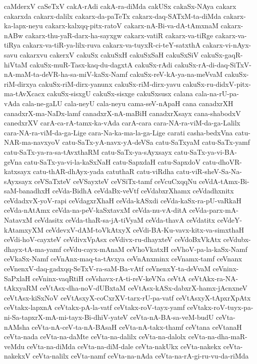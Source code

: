 {caMderxV
caSeTxV
cakA-rAdi
cakA-ra-diMda
cakUSx
cakaSx-NAya
cakarx
cakarxda
cakarx-dalilx
cakarx-da-paTeTx
cakarx-daq-SATxM-ta-diMda
cakarx-ka-lapx-neyu
cakarx-kalxqq-pitx-ratoV
cakarx-nA-Bi-va-dA-tAmxnaM
cakarx-nABw
cakarx-thu-yaR-darx-ha-sayxgw
cakarx-vatiR
cakarx-va-tiRge
cakarx-va-tiRya
cakarx-va-tiR-ya-lilx-ruva
cakarx-va-tuyxR-ci-teY-satxthA
cakarx-vi-nAyx-savu
cakarxvu
cakerxV
cakuSx
cakuSxH
cakuSxSaH
cakuSxSiV
cakuSx-gaqR-hiVtaM
cakuSx-muR-Tasx-kaq-du-dagxtA
cakuSx-rAdi
cakuSx-rA-di-daq-SiTxV-nA-maM-ta-deVR-ha-sa-miV-kaSx-Namf
cakuSx-reV-kA-ya-na-meVvaM
cakuSx-riM-dirxya
cakuSx-riM-dirx-yanunx
cakuSx-riM-dirx-yavu
cakuSx-ru-didxV-pitx-ma-tAvXcacx
cakuSx-sisxgU
cakuSx-sisxge
cakuSxsusx
calana
cala-na-rU-pa-vAda
cala-ne-gaLU
cala-neyU
cala-neyu
cama-seV-nApaH
cana
canadxrXH
canadxrX-ma-NaDx-lamf
canadxrX-nA-maBiH
canadxrXsayx
cana-shabodxV
canedxrXV
carA-ca-rA-tamx-ka-vAda
carA-cara
cara-NA-ra-viM-da-ga-Lalilx
cara-NA-ra-viM-da-ga-Lige
cara-Na-ka-ma-la-ga-Lige
carati
casha-bedxVna
catu-NAR-ma-navxyoV
catu-SaTx-yA-navx-yA-deVSa
catu-SaTxyaM
catu-SaTx-yamf
catu-SaTx-ya-ra-sa-tAvxthaRM
catu-SaTx-ya-sAyxsayx
catu-SaTx-ya-vi-BA-geVna
catu-SaTx-ya-vi-la-kaSxNaH
catu-SapxdaH
catu-SapxdoV
catu-dhoVR-katxsayx
catu-thAR-dhAyx-yada
catuthaR
catu-viRdha
catu-viR-sheV-Sa-Na-sAyxsayx
ceVSaTxteV
ceVSayxteV
ceVSiTx-tamf
ceVcuCxqqNu
ceVdA-tAmx-Bi-saM-banadhxH
ceVda-BidhA
ceVdaBx-veVtf
ceVdabxrXhamx
ceVdadhxnitx
ceVdadxvX-yoV-rapi
ceVdagxrXhaH
ceVda-kASxdi
ceVda-kaSx-ra-pU-vaRkaH
ceVda-nAtAmx
ceVda-na-peV-kaSxtavxM
ceVda-nu-vA-ditA
ceVda-parx-mA-NatavxM
ceVdasitx
ceVda-thaR-sa-jA-tiVyaM
ceVda-thavA
ceVdatitx
ceVdeY-kAtamxyXM
ceVdevxV-dAM-toVkAtxyX
ceVdi-BA-Ku-vavx-kitx-va-simxthaH
ceVdi-hoV-cayxteV
ceVdivxVpAsx
ceVdivx-ru-dhayxteV
ceVdoBxVkAtx
ceVdubx-dhayx-tA-ma-yamf
ceVdu-cayx-mAnaM
ceVhoVkatxH
ceVhoV-pa-la-kaSx-Namf
ceVkaSx-Namf
ceVnAnx-maq-ta-tAvxya
ceVnAnxminx
ceVnamx-tamf
ceVnanx
ceVnenxV-daq-gadxqq-SeTxV-ra-saM-Ba-vAtf
ceVnenxY-ta-deVvaM
ceVninx-SaPxlaH
ceVninx-vaqRtiH
ceVshavx-rA-ti-reV-keVNa
ceVtA
ceVtAkx-ra-NA-tAkxyaRM
ceVtAsx-dha-noV-dUBxtaM
ceVtAsx-kASx-dabxrX-hamx-jAcnxneV
ceVtAsx-kiSxNoV
ceVtAsxyX-coCxrXV-tarx-rU-pa-vatf
ceVtAsxyX-tApxrXpAtx
ceVtakx-lapxnA
ceVtakx-pA-la-vatf
ceVtakx-roV-tayx-yamf
ceVtakx-roV-tuyx-pa-ni-Sa-tapxrX-mA-mi-tayx-Bi-dhiV-yateV
ceVta-nA-BA-sa-veM-budU
ceVta-nAMsha
ceVta-nA-ceV-ta-nA-BAsaH
ceVta-nA-takx-thamf
ceVtana
ceVtanaH
ceVta-nada
ceVta-na-daMte
ceVta-na-dalilx
ceVta-na-dalolx
ceVta-na-dha-maR-veMdu
ceVta-na-diMda
ceVta-na-diM-dale
ceVta-nakUkx
ceVta-nakekx
ceVta-nakekxV
ceVta-nalilx
ceVta-namf
ceVta-na-nAda
ceVta-na-rA-gi-ru-vu-da-riMda
}
